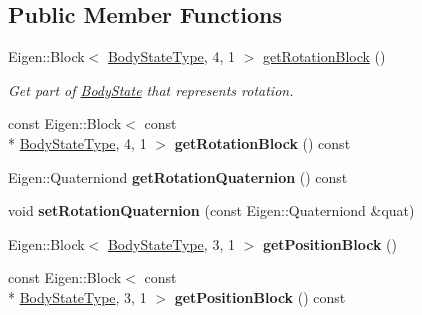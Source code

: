 \subsection*{Public Member Functions}
\begin{DoxyCompactItemize}
\item 
\hypertarget{class_body_state_a980cbcae469aa1fc0d7efec5248db0d1}{Eigen\-::\-Block$<$ \hyperlink{class_body_state_ac95355c4974335a6f69da770d2de30e0}{Body\-State\-Type}, 4, 1 $>$ \hyperlink{class_body_state_a980cbcae469aa1fc0d7efec5248db0d1}{get\-Rotation\-Block} ()}\label{class_body_state_a980cbcae469aa1fc0d7efec5248db0d1}

\begin{DoxyCompactList}\small\item\em Get part of \hyperlink{class_body_state}{Body\-State} that represents rotation. \end{DoxyCompactList}\item 
\hypertarget{class_body_state_a40ed7d0b83717ee344b24e21cfd1e38b}{const Eigen\-::\-Block$<$ const \\*
\hyperlink{class_body_state_ac95355c4974335a6f69da770d2de30e0}{Body\-State\-Type}, 4, 1 $>$ {\bfseries get\-Rotation\-Block} () const }\label{class_body_state_a40ed7d0b83717ee344b24e21cfd1e38b}

\item 
\hypertarget{class_body_state_a4210b31a5035b3d9cd64111011a19274}{Eigen\-::\-Quaterniond {\bfseries get\-Rotation\-Quaternion} () const }\label{class_body_state_a4210b31a5035b3d9cd64111011a19274}

\item 
\hypertarget{class_body_state_ac1931ea582df06676f52ed72ec26140a}{void {\bfseries set\-Rotation\-Quaternion} (const Eigen\-::\-Quaterniond \&quat)}\label{class_body_state_ac1931ea582df06676f52ed72ec26140a}

\item 
\hypertarget{class_body_state_a1b44594cf450da4c6aa2af1b74fa254a}{Eigen\-::\-Block$<$ \hyperlink{class_body_state_ac95355c4974335a6f69da770d2de30e0}{Body\-State\-Type}, 3, 1 $>$ {\bfseries get\-Position\-Block} ()}\label{class_body_state_a1b44594cf450da4c6aa2af1b74fa254a}

\item 
\hypertarget{class_body_state_a7c8ffc8a6aed56373afaef99cb9f0b69}{const Eigen\-::\-Block$<$ const \\*
\hyperlink{class_body_state_ac95355c4974335a6f69da770d2de30e0}{Body\-State\-Type}, 3, 1 $>$ {\bfseries get\-Position\-Block} () const }\label{class_body_state_a7c8ffc8a6aed56373afaef99cb9f0b69}


\end{DoxyCompactItemize}
